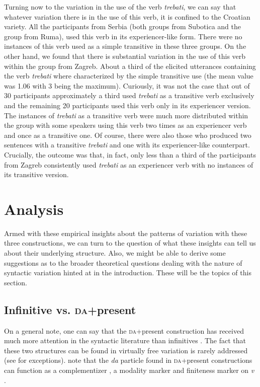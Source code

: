 \documentclass[output=paper,modfonts,newtxmath,hidelinks,]{langscibook}
\begin{document}
\largerpage%
Turning now to the variation in the use of the verb \textit{trebati}, we can say that whatever variation there is in the use of this verb, it is confined to the Croatian variety. All the participants from Serbia (both groups from Subotica and the group from Ruma), used this verb in its experiencer-like form. There were no instances of this verb used as a simple transitive in these three groups. On the other hand, we found that there is substantial variation in the use of this verb within the group from Zagreb. About a third of the elicited utterances containing the verb \textit{trebati} where characterized by the simple transitive use (the mean value was 1.06 with 3 being the maximum). Curiously, it was not the case that out of 30 participants approximately a third used \textit{trebati} as a transitive verb exclusively and the remaining 20 participants used this verb only in its experiencer version. The instances of \textit{trebati} as a transitive verb were much more distributed within the group with some speakers using this verb two times as an experiencer verb and once as a transitive one. Of course, there were also those who produced two sentences with a transitive \textit{trebati} and one with its experiencer-like counterpart. Crucially, the outcome was that, in fact, only less than a third of the participants from Zagreb consistently used \textit{trebati} as an experiencer verb with no instances of its transitive version.

\section{Analysis}\label{7:s4}


\largerpage%
Armed with these empirical insights about the patterns of variation with these three constructions, we can turn to the question of what these insights can tell us about their underlying structure. Also, we might be able to derive some suggestions as to the broader theoretical questions dealing with the nature of syntactic variation hinted at in the introduction. These will be the topics of this section.

\subsection{Infinitive vs. \textsc{da}+present}\label{7:s4.1}

On a general note, one can say that the \textsc{da}+present construction has received much more attention in the syntactic literature than infinitives \citep{Todorovic2012,Miseska-Tomic2004}. The fact that these two structures can be found in virtually free variation is rarely addressed (see \citealt{Belic2005} for exceptions). \citet{TodorovicWurmbrand2015} note that the \textit{da} particle found in \textsc{da}+present constructions can function as a complementizer , a modality marker  and finiteness marker on \textit{v} .
\end{document}
